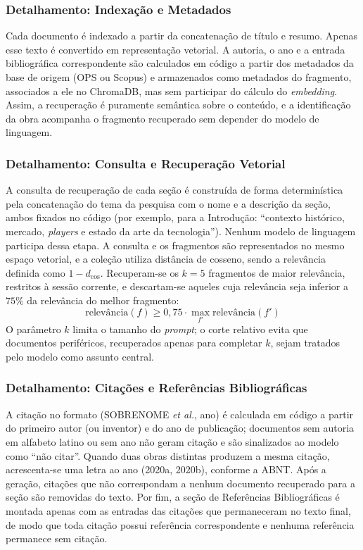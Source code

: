\documentclass[12pt, a4paper]{article}
\begin{document}
  \subsubsection{Detalhamento: Indexação e Metadados}

  Cada documento é indexado a partir da concatenação de título e resumo. Apenas esse texto é convertido em representação vetorial. A autoria, o ano e a entrada bibliográfica correspondente são calculados em código a partir dos metadados da base de origem (OPS ou Scopus) e armazenados como metadados do fragmento, associados a ele no ChromaDB, mas sem participar do cálculo do \textit{embedding}. Assim, a recuperação é puramente semântica sobre o conteúdo, e a identificação da obra acompanha o fragmento recuperado sem depender do modelo de linguagem.

  \subsubsection{Detalhamento: Consulta e Recuperação Vetorial}

  A consulta de recuperação de cada seção é construída de forma determinística pela concatenação do tema da pesquisa com o nome e a descrição da seção, ambos fixados no código (por exemplo, para a Introdução: ``contexto histórico, mercado, \textit{players} e estado da arte da tecnologia''). Nenhum modelo de linguagem participa dessa etapa. A consulta e os fragmentos são representados no mesmo espaço vetorial, e a coleção utiliza distância de cosseno, sendo a relevância definida como $1 - d_{\cos}$. Recuperam-se os $k = 5$ fragmentos de maior relevância, restritos à sessão corrente, e descartam-se aqueles cuja relevância seja inferior a $75\%$ da relevância do melhor fragmento:
  $$ \text{relevância}(f) \ge 0{,}75 \cdot \max_{f'} \text{relevância}(f') $$
  O parâmetro $k$ limita o tamanho do \textit{prompt}; o corte relativo evita que documentos periféricos, recuperados apenas para completar $k$, sejam tratados pelo modelo como assunto central.

  \subsubsection{Detalhamento: Citações e Referências Bibliográficas}

  A citação no formato (SOBRENOME \textit{et al.}, ano) é calculada em código a partir do primeiro autor (ou inventor) e do ano de publicação; documentos sem autoria em alfabeto latino ou sem ano não geram citação e são sinalizados ao modelo como ``não citar''. Quando duas obras distintas produzem a mesma citação, acrescenta-se uma letra ao ano (2020a, 2020b), conforme a ABNT. Após a geração, citações que não correspondam a nenhum documento recuperado para a seção são removidas do texto. Por fim, a seção de Referências Bibliográficas é montada apenas com as entradas das citações que permaneceram no texto final, de modo que toda citação possui referência correspondente e nenhuma referência permanece sem citação.
\end{document}
